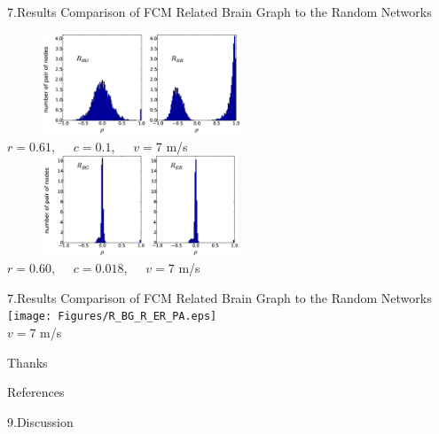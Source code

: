 \documentclass{beamer}
\begin{document}
\begin{frame}{7.Results}
\footnotesize{Comparison of FCM Related Brain Graph to the Random Networks}
\begin{center}

\includegraphics[width=8cm, height=3cm]{Figures/R_BG_R_ER_histo_1.eps} \\
\tiny{$r=0.61$,~~~$c=0.1$,~~~$v=7$ m/s} \\
\includegraphics[width=8cm, height=3cm]{Figures/R_BG_R_ER_histo_2.eps} \\
\tiny{$r=0.60$,~~~$c=0.018$,~~~$v=7$ m/s}
\end{center}


\end{frame}





\begin{frame}{7.Results}
\footnotesize{Comparison of FCM Related Brain Graph to the Random Networks}
\centering
\texttt{[image: Figures/R\_BG\_R\_ER\_PA.eps]}\\
\tiny{$v=7$ m/s}

\end{frame}









\begin{frame}{Thanks}

\end{frame}



\begin{frame}{References}

\end{frame}


\begin{frame}{9.Discussion}

\end{frame}
\end{document}
